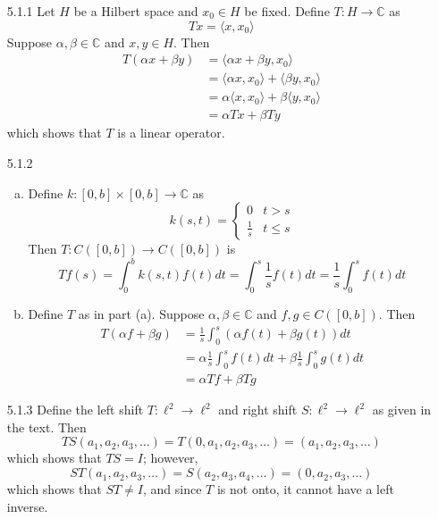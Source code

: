 \documentclass[../../Solutions.tex]{subfiles}
\begin{document}
\begin{itemize}
	\item [5.1.1] Let $H$ be a Hilbert space and $x_0 \in H$ be fixed.
		Define $T:H\to\mathbb{C}$ as
		$$ Tx = \langle x,x_0 \rangle $$
		Suppose $\alpha,\beta \in \mathbb{C}$ and $x,y \in H$. Then
		\begin{equation*} \begin{split} 
			T(\alpha x + \beta y) &= \langle \alpha x + \beta y , x_0 \rangle \\
				&= \langle \alpha x,x_0 \rangle + \langle \beta y, x_0 \rangle \\
				&= \alpha \langle x,x_0 \rangle + \beta \langle y, x_0 \rangle \\
				&= \alpha Tx + \beta Ty
		\end{split} \end{equation*}
		which shows that $T$ is a linear operator.
	
	\item [5.1.2] 
	\begin{enumerate}[(a)]
		\item Define $k:[0,b]\times[0,b]\to\mathbb{C}$ as
			\begin{equation*}
				k(s,t) = \begin{cases}
					0 & t>s \\
					\frac{1}{s} & t \leq s
				\end{cases}
			\end{equation*}
			Then $T:C([0,b])\to C([0,b])$ is
			$$ Tf(s) = \int_0^b k(s,t)f(t)dt = \int_0^s \frac{1}{s}f(t)dt = \frac{1}{s} \int_0^s f(t)dt $$
		\item Define $T$ as in part (a).
			Suppose $\alpha,\beta \in \mathbb{C}$ and $f,g \in C([0,b])$. Then
			\begin{equation*} \begin{split} 
				T(\alpha f + \beta g) &= \frac{1}{s} \int_0^s (\alpha f(t) + \beta g(t)) dt \\
					&= \alpha \frac{1}{s} \int_0^s f(t) dt + \beta \frac{1}{s} \int_0^s g(t) dt \\
					&= \alpha Tf + \beta Tg
			\end{split} \end{equation*}
	\end{enumerate}
	
	\item [5.1.3] Define the left shift $T:\ell^2\to\ell^2$ and right shift $S:\ell^2\to\ell^2$ as given in the text.
		Then
		$$ TS(a_1,a_2,a_3,\dots) = T(0,a_1,a_2,a_3,\dots) = (a_1,a_2,a_3,\dots) $$
		which shows that $TS = I$; however,
		$$ ST(a_1,a_2,a_3,\dots) = S(a_2,a_3,a_4,\dots) = (0,a_2,a_3,\dots) $$
		which shows that $ST \neq I$, and since $T$ is not onto, it cannot have a left inverse.
	

\end{itemize}
\end{document}
